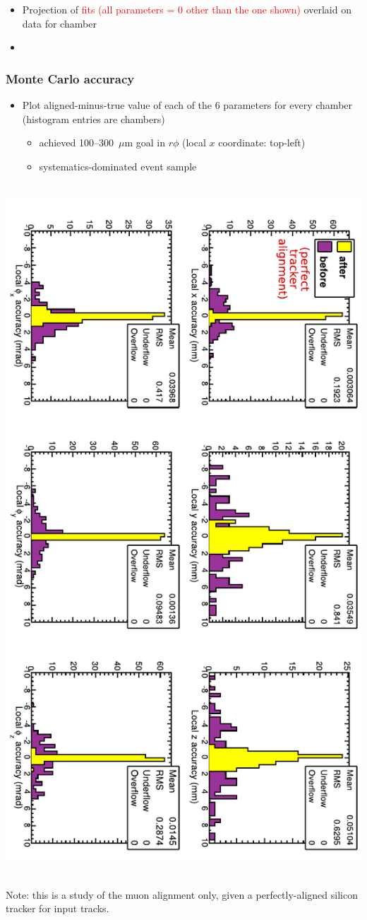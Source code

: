 \documentclass[compress]{beamer}
\begin{document}
\begin{frame}
\begin{columns}
\end{columns}

\begin{itemize}
\item Projection of \textcolor{red}{fits (all parameters = 0 other than the one shown)} overlaid on {\it {}} data for  chamber
\item {}
\end{itemize}
\end{frame}

\begin{frame}
\frametitle{Monte Carlo accuracy}

\begin{itemize}
\item Plot aligned-minus-true value of each of the 6 parameters for every chamber (histogram entries are chambers)
\begin{itemize}
\item achieved 100--300~$\mu$m goal in $r\phi$ (local $x$ coordinate: top-left)
\item systematics-dominated event sample
\end{itemize}
\end{itemize}

\vfill
\mbox{ } \hfill \includegraphics[height=0.9\linewidth, angle=90]{hip_MC_simple2.pdf} \hfill \mbox{ }

\vfill \scriptsize Note: this is a study of the muon alignment only,
given a perfectly-aligned silicon tracker for input tracks.
\end{frame}
\end{document}
